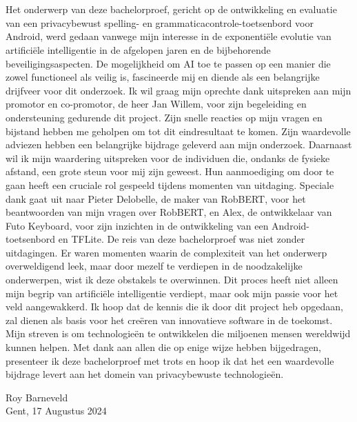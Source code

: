 
\chapter*{}%
\label{ch:voorwoord}



Het onderwerp van deze bachelorproef, gericht op de ontwikkeling en evaluatie van een privacybewust spelling- en grammaticacontrole-toetsenbord voor Android, werd gedaan vanwege mijn interesse in de exponentiële evolutie van artificiële intelligentie in de afgelopen jaren en de bijbehorende beveiligingsaspecten. De mogelijkheid om AI toe te passen op een manier die zowel functioneel als veilig is, fascineerde mij en diende als een belangrijke drijfveer voor dit onderzoek.
Ik wil graag mijn oprechte dank uitspreken aan mijn promotor en co-promotor, de heer Jan Willem, voor zijn begeleiding en ondersteuning gedurende dit project. Zijn snelle reacties op mijn vragen en bijstand hebben me geholpen om tot dit eindresultaat te komen. Zijn waardevolle adviezen hebben een belangrijke bijdrage geleverd aan mijn onderzoek.
Daarnaast wil ik mijn waardering uitspreken voor de individuen die, ondanks de fysieke afstand, een grote steun voor mij zijn geweest. Hun aanmoediging om door te gaan heeft een cruciale rol gespeeld tijdens momenten van uitdaging. Speciale dank gaat uit naar Pieter Delobelle, de maker van RobBERT, voor het beantwoorden van mijn vragen over RobBERT, en Alex, de ontwikkelaar van Futo Keyboard, voor zijn inzichten in de ontwikkeling van een Android-toetsenbord en TFLite.
De reis van deze bachelorproef was niet zonder uitdagingen. Er waren momenten waarin de complexiteit van het onderwerp overweldigend leek, maar door mezelf te verdiepen in de noodzakelijke onderwerpen, wist ik deze obstakels te overwinnen. Dit proces heeft niet alleen mijn begrip van artificiële intelligentie verdiept, maar ook mijn passie voor het veld aangewakkerd.
Ik hoop dat de kennis die ik door dit project heb opgedaan, zal dienen als basis voor het creëren van innovatieve software in de toekomst. Mijn streven is om technologieën te ontwikkelen die miljoenen mensen wereldwijd kunnen helpen.
Met dank aan allen die op enige wijze hebben bijgedragen, presenteer ik deze bachelorproef met trots en hoop ik dat het een waardevolle bijdrage levert aan het domein van privacybewuste technologieën.

\vspace{1cm}

\begin{flushright}
    Roy Barneveld\\Gent, 17 Augustus 2024
\end{flushright}